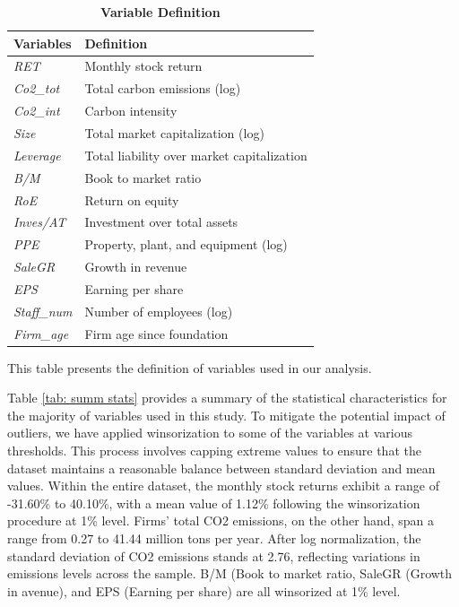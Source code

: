 \documentclass[12pt]{article}
\begin{document}
\begin{table}[!ht]
\footnotesize
\centering
\caption{\textbf{Variable Definition}}
\label{tab: var def}
\begin{tabular}{ll}
\toprule
Variables & Definition \\ \hline

\textit{RET} & Monthly stock return \\
\textit{Co2\_tot} & Total carbon emissions (log) \\
\textit{Co2\_int} & Carbon intensity \\
\textit{Size} & Total market capitalization (log) \\
\textit{Leverage} & Total liability over market capitalization \\
\textit{B/M} & Book to market ratio \\
\textit{RoE} & Return on equity \\
\textit{Inves/AT} & Investment over total assets \\
\textit{PPE} & Property, plant, and equipment (log) \\
\textit{SaleGR} & Growth in revenue \\
\textit{EPS} & Earning per share \\
\textit{Staff\_num} & Number of employees (log) \\
\textit{Firm\_age} & Firm age since foundation\\
  
\bottomrule
\end{tabular}
\begin{tablenotes}
\footnotesize
\item This table presents the definition of variables used in our analysis.
\end{tablenotes}
\end{table}

Table \ref{tab: summ stats} provides a summary of the statistical characteristics for the majority of variables used in this study. To mitigate the potential impact of outliers, we have applied winsorization to some of the variables at various thresholds. This process involves capping extreme values to ensure that the dataset maintains a reasonable balance between standard deviation and mean values. Within the entire dataset, the monthly stock returns exhibit a range of -31.60\% to 40.10\%, with a mean value of 1.12\% following the winsorization procedure at 1\% level. Firms' total CO2 emissions, on the other hand, span a range from 0.27 to 41.44 million tons per year. After log normalization, the standard deviation of CO2 emissions stands at 2.76, reflecting variations in emissions levels across the sample. B/M (Book to market ratio, SaleGR (Growth in avenue), and EPS (Earning per share) are all winsorized at 1\% level. 
\end{document}
